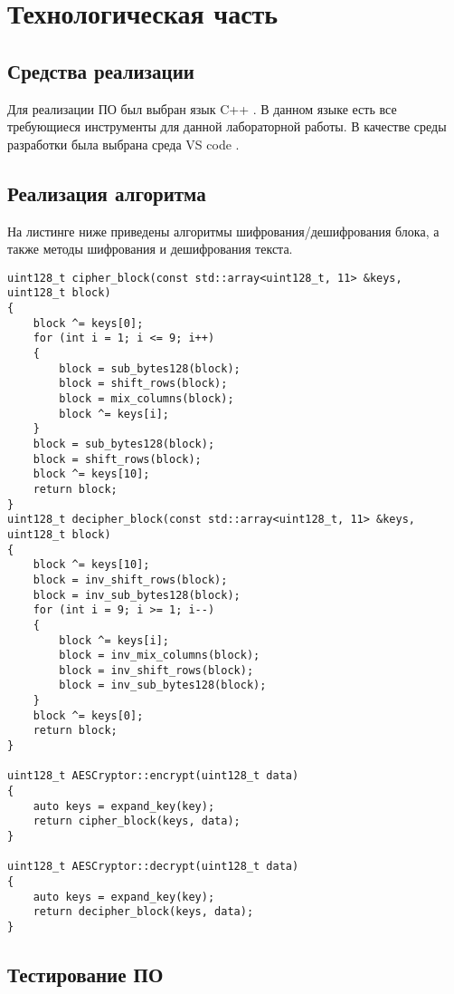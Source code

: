 \chapter{Технологическая часть}

\section{Средства реализации}

Для реализации ПО был выбран язык C++ \cite{C++}.
В данном языке есть все требующиеся инструменты для данной лабораторной работы.
В качестве среды разработки была выбрана среда VS code \cite{vscode}.

\section{Реализация алгоритма}

На листинге ниже приведены алгоритмы шифрования/дешифрования блока, а также методы шифрования и дешифрования текста.

\begin{lstlisting}[caption={Алгоритм шифрования блока}]
uint128_t cipher_block(const std::array<uint128_t, 11> &keys, uint128_t block)
{
    block ^= keys[0];
    for (int i = 1; i <= 9; i++)
    {
        block = sub_bytes128(block);
        block = shift_rows(block);
        block = mix_columns(block);
        block ^= keys[i];
    }
    block = sub_bytes128(block);
    block = shift_rows(block);
    block ^= keys[10];
    return block;
}
uint128_t decipher_block(const std::array<uint128_t, 11> &keys, uint128_t block)
{
    block ^= keys[10];
    block = inv_shift_rows(block);
    block = inv_sub_bytes128(block);
    for (int i = 9; i >= 1; i--)
    {
        block ^= keys[i];
        block = inv_mix_columns(block);
        block = inv_shift_rows(block);
        block = inv_sub_bytes128(block);
    }
    block ^= keys[0];
    return block;
}

uint128_t AESCryptor::encrypt(uint128_t data)
{
    auto keys = expand_key(key);
    return cipher_block(keys, data);
}

uint128_t AESCryptor::decrypt(uint128_t data)
{
    auto keys = expand_key(key);
    return decipher_block(keys, data);
}
\end{lstlisting}

\section{Тестирование ПО}

